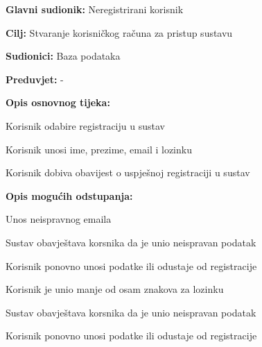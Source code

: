					\noindent {}
					\begin{packed_item}
	
						\item \textbf{Glavni sudionik: } Neregistrirani korisnik
						\item  \textbf{Cilj:} Stvaranje korisničkog računa za pristup sustavu
						\item  \textbf{Sudionici:} Baza podataka
						\item  \textbf{Preduvjet:} -
						\item  \textbf{Opis osnovnog tijeka:}
						
						\item[] \begin{packed_enum}
	
							\item Korisnik odabire registraciju u sustav
							\item Korisnik unosi ime, prezime, email i lozinku
							\item Korisnik dobiva obavijest o uspješnoj registraciji u sustav
						\end{packed_enum}
						
						\item  \textbf{Opis mogućih odstupanja:}
						
						\item[] \begin{packed_item}
	
							\item[2.a] Unos neispravnog emaila
							
							\item[] \begin{packed_enum}
								
								\item Sustav obavještava korsnika da je unio neispravan podatak
								\item Korisnik ponovno unosi podatke ili odustaje od registracije
								
							\end{packed_enum}
							\item[2.b] Korisnik je unio manje od osam znakova za lozinku
							
								\item[] \begin{packed_enum}
								
								\item Sustav obavještava korsnika da je unio neispravan podatak
								\item Korisnik ponovno unosi podatke ili odustaje od registracije
								
							\end{packed_enum}
							
						\end{packed_item}
					\end{packed_item}
					
